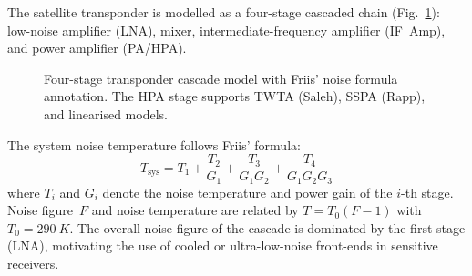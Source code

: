 \documentclass[conference]{IEEEtran}
\begin{document}
The satellite transponder is modelled as a four-stage cascaded chain
(Fig.~\ref{fig:transponder}): low-noise amplifier (LNA), mixer,
intermediate-frequency amplifier (IF~Amp), and power amplifier (PA/HPA).

\begin{figure}[!t]
\centering
{}
\caption{Four-stage transponder cascade model with Friis' noise
  formula annotation.  The HPA stage supports TWTA (Saleh), SSPA
  (Rapp), and linearised models.}
\label{fig:transponder}
\end{figure}

The system noise temperature follows Friis' formula:
\begin{equation}
  T_{\text{sys}} = T_1 + \frac{T_2}{G_1} + \frac{T_3}{G_1 G_2}
                 + \frac{T_4}{G_1 G_2 G_3}
  \label{eq:friis}
\end{equation}
where $T_i$ and $G_i$ denote the noise temperature and power gain of the
$i$-th stage.  Noise figure~$F$ and noise temperature are related by
$T = T_0(F - 1)$ with $T_0 = \SI{290}{K}$.  The overall noise
figure of the cascade is dominated by the first stage (LNA), motivating
the use of cooled or ultra-low-noise front-ends in sensitive receivers.
\end{document}
